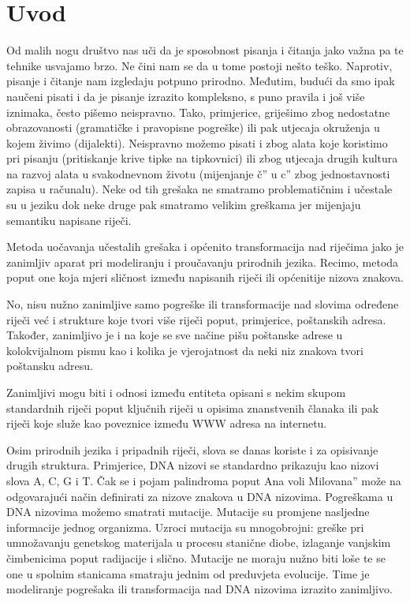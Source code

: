 \chapter*{Uvod}

Od malih nogu društvo nas uči da je sposobnost pisanja i čitanja jako
važna pa te tehnike usvajamo brzo. Ne čini nam se da u tome postoji nešto teško.
Naprotiv, pisanje i čitanje nam izgledaju potpuno prirodno. Međutim, budući da smo ipak
naučeni pisati i da je pisanje izrazito kompleksno, s puno pravila
i još više iznimaka, često pišemo neispravno.
Tako, primjerice, griješimo
zbog nedostatne obrazovanosti (gramatičke i pravopisne pogreške)
ili pak utjecaja okruženja u kojem živimo (dijalekti). Neispravno možemo
pisati i zbog alata koje koristimo pri pisanju
(pritiskanje krive tipke na tipkovnici)
ili zbog utjecaja drugih kultura na razvoj
alata u svakodnevnom životu (mijenjanje {\glqq}č'' u {\glqq}c'' zbog jednostavnosti
zapisa u računalu). Neke od tih grešaka ne smatramo problematičnim
i učestale su u jeziku dok neke druge pak smatramo velikim greškama
jer mijenjaju semantiku napisane riječi.

Metoda uočavanja učestalih grešaka i općenito transformacija nad riječima
jako je zanimljiv aparat pri modeliranju i proučavanju
prirodnih jezika. Recimo, metoda poput one koja mjeri sličnost između napisanih
riječi ili općenitije nizova znakova.

No, nisu nužno zanimljive samo pogreške ili transformacije nad slovima
određene riječi već i strukture koje tvori više riječi poput,
primjerice, poštanskih adresa.
Također, zanimljivo je i na koje se sve načine pišu
poštanske adrese u kolokvijalnom pismu kao i kolika je
vjerojatnost da neki niz znakova tvori poštansku adresu.

Zanimljivi mogu biti i odnosi između entiteta opisani s nekim
skupom standardnih riječi poput ključnih riječi u opisima
znanstvenih članaka ili pak riječi koje služe kao poveznice
između WWW adresa na internetu.

Osim prirodnih jezika i pripadnih riječi, slova se danas koriste
i za opisivanje drugih struktura. Primjerice, DNA nizovi se standardno
prikazuju kao nizovi slova A, C, G i T. Čak se i pojam palindroma
poput {\glqq}Ana voli Milovana'' može na odgovarajući način definirati
za nizove znakova u DNA nizovima. Pogreškama u DNA nizovima
možemo smatrati mutacije. Mutacije su promjene nasljedne
informacije jednog organizma.
Uzroci mutacija su mnogobrojni: greške pri umnožavanju genetskog materijala 
u procesu stanične diobe, izlaganje vanjskim čimbenicima poput radijacije
i slično. Mutacije ne moraju nužno biti loše te se one u spolnim stanicama
smatraju jednim od preduvjeta evolucije. Time je modeliranje
pogrešaka ili transformacija nad DNA nizovima izrazito zanimljivo.

